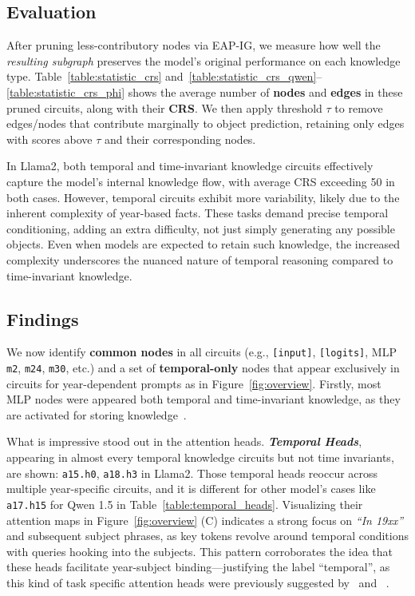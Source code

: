\subsection{Evaluation}
\label{subsec:eval}
After pruning less-contributory nodes via EAP-IG, we measure how well the \emph{resulting subgraph} preserves the model’s original performance on each knowledge type. 
Table~\ref{table:statistic_crs} and~\ref{table:statistic_crs_qwen}--\ref{table:statistic_crs_phi} shows the average number of \textbf{nodes} and \textbf{edges} in these pruned circuits, along with their \textbf{CRS}.
We then apply threshold \(\tau\) to remove edges/nodes that contribute marginally to object prediction, retaining only edges with scores above \(\tau\) and their corresponding nodes.

In Llama2, both temporal and time-invariant knowledge circuits effectively capture the model’s internal knowledge flow, with average CRS exceeding 50 in both cases. 
However, temporal circuits exhibit more variability, likely due to the inherent complexity of year-based facts. 
These tasks demand precise temporal conditioning, adding an extra difficulty, not just simply generating any possible objects. 
Even when models are expected to retain such knowledge, the increased complexity underscores the nuanced nature of temporal reasoning compared to time-invariant knowledge.

\subsection{Findings}
\label{subsec:findings}
We now identify \textbf{common nodes} in all circuits (e.g., \texttt{[input]}, \texttt{[logits]}, MLP \texttt{m2}, \texttt{m24}, \texttt{m30}, etc.) and a set of \textbf{temporal-only} nodes that appear exclusively in circuits for year-dependent prompts as in Figure~\ref{fig:overview}.
Firstly, most MLP nodes were appeared both temporal and time-invariant knowledge, as they are activated for storing knowledge~\citep{geva2021mlp, KN, whatKN}.

What is impressive stood out in the attention heads.
\emph{\textbf{Temporal Heads}}, appearing in almost every temporal knowledge circuits but not time invariants, are shown: \verb|a15.h0|, \verb|a18.h3| in Llama2.
Those temporal heads reoccur across multiple year-specific circuits, and it is different for other model's cases like \verb|a17.h15| for Qwen 1.5 in Table~\ref{table:temporal_heads}.
Visualizing their attention maps in Figure~\ref{fig:overview} (C) indicates a strong focus on \emph{“In 19xx”} and subsequent subject phrases, as key tokens revolve around temporal conditions with queries hooking into the subjects.
This pattern corroborates the idea that these heads facilitate year-subject binding—justifying the label “temporal”, as this kind of task specific attention heads were previously suggested by~\citealp{ioi, circuitcolor, subhead, rethead} and ~\citealp{headsurvey}.


